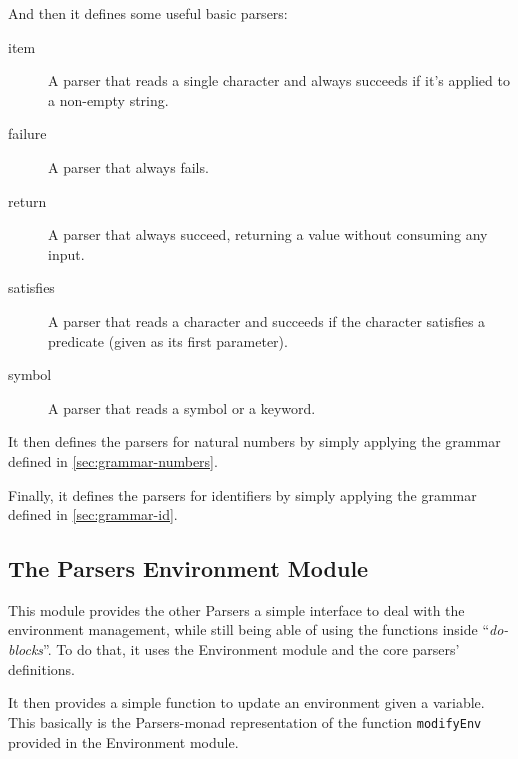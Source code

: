 \documentclass{esposito-documentation}
\begin{document}


And then it defines some useful basic parsers:
\begin{description}
	\item[item] A parser that reads a single character and always succeeds if
		it's applied to a non-empty string.
	\item[failure] A parser that always fails.
	\item[return] A parser that always succeed, returning a value without
		consuming any input.
	\item[satisfies] A parser that reads a character and succeeds if the
		character satisfies a predicate (given as its first parameter).
	\item[symbol] A parser that reads a symbol or a keyword.
\end{description}



It then defines the parsers for natural numbers by simply applying the grammar
defined in \autoref{sec:grammar-numbers}.



Finally, it defines the parsers for identifiers by simply applying the grammar
defined in \autoref{sec:grammar-id}.



\subsection{The Parsers Environment Module}


This module provides the other Parsers a simple interface to deal with the
environment management, while still being able of using the functions inside
``\emph{do-blocks}''. To do that, it uses the Environment module and the core
parsers' definitions.



It then provides a simple function to update an environment given a variable.
This basically is the Parsers-monad representation of the function
\lstinline|modifyEnv| provided in the Environment module.


\end{document}
